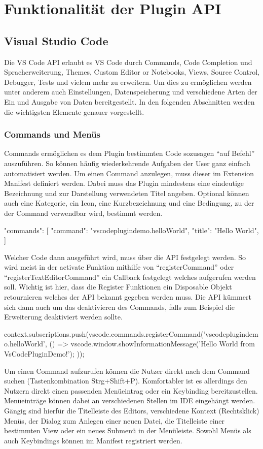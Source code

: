 \section{Funktionalität der Plugin API}
\label{sec:FunktionalitätDerPluginAPI}

\subsection{Visual Studio Code}

Die VS Code API erlaubt es VS Code durch Commands, Code Completion und Spracherweiterung, 
Themes, Custom Editor or Notebooks, Views, Source Control, Debugger, Tests und vielem mehr zu
erweitern. Um dies zu ermöglichen werden unter anderem auch Einstellungen, Datenspeicherung
und verschiedene Arten der Ein und Ausgabe von Daten bereitgestellt. In den folgenden Abschnitten
werden die wichtigsten Elemente genauer vorgestellt.

\subsubsection{Commands und Menüs}
  Commands ermöglichen es dem Plugin bestimmten Code sozusagen \enquote{auf Befehl} auszuführen.
  So können häufig wiederkehrende Aufgaben der User ganz einfach automatisiert werden.
  Um einen Command anzulegen, muss dieser im Extension Manifest definiert werden. Dabei muss
  das Plugin mindestens eine eindeutige Bezeichnung und zur Darstellung verwendeten Titel angeben.
  Optional können auch eine Kategorie, ein Icon, eine Kurzbezeichnung und eine Bedingung, 
  zu der der Command verwendbar wird, bestimmt werden.
  \begin{JsCode}
    "commands": [
      {
        "command": "vscodeplugindemo.helloWorld",
        "title": "Hello World",
      }
    ]
  \end{JsCode}
  Welcher Code dann ausgeführt wird, muss über die API festgelegt werden. So wird meist
  in der activate Funktion mithilfe von \enquote{registerCommand} oder \enquote{registerTextEditorCommand}
  ein Callback festgelegt welches aufgerufen werden soll. Wichtig ist hier, dass
  die Register Funktionen ein Disposable Objekt retournieren welches der API bekannt gegeben werden
  muss. Die API kümmert sich dann auch um das deaktivieren des Commands, falls zum Beispiel
  die Erweiterung deaktiviert werden sollte.
  \begin{JsCode}
    context.subscriptions.push(vscode.commands.registerCommand('vscodeplugindemo.helloWorld', () => {
      vscode.window.showInformationMessage('Hello World from VsCodePluginDemo!');
    }));
  \end{JsCode}
  Um einen Command aufzurufen können die Nutzer direkt nach dem Command suchen (Tastenkombination Strg+Shift+P).
  Komfortabler ist es allerdings den Nutzern direkt einen passenden Menüeintrag oder ein Keybinding
  bereitzustellen. Menüeinträge können dabei an verschiedenen Stellen im IDE eingehängt werden.
  Gängig sind hierfür die Titelleiste des Editors, verschiedene Kontext (Rechtsklick) Menüs, der Dialog
  zum Anlegen einer neuen Datei, die Titelleiste einer bestimmten View oder ein neues Submenü in der Menüleiste.
  Sowohl Menüs als auch Keybindings können im Manifest registriert werden.
